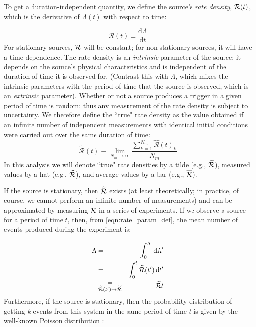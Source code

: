 To get a duration-independent quantity, we define the source's \emph{rate density}, $\mathcal{R}(t)$, which is the derivative of $\Lambda(t)$ with respect to time:

\begin{equation}
\label{eqn:rate_param_def}
\mathcal{R}(t) \equiv \frac{\mathrm{d}\Lambda}{\mathrm{d}t}
\end{equation}
For stationary sources, $\mathcal{R}$ will be constant; for non-stationary sources, it will have a time dependence. The rate density is an \emph{intrinsic} parameter of the source: it depends on the source's physical characteristics and is independent of the duration of time it is observed for. (Contrast this with $\Lambda$, which mixes the intrinsic parameters with the period of time that the source is observed, which is an \emph{extrinsic} parameter). Whether or not a source produces a trigger in a given period of time is random; thus any measurement of the rate density is subject to uncertainty. We therefore define the ``true" rate density as the value obtained if an infinite number of independent measurements with identical initial conditions were carried out over the same duration of time:
\begin{equation}
\label{eqn:true_rate_param_def}
\widetilde{\mathcal{R}}(t) \equiv \lim_{N_m \to \infty} \frac{\sum_{k=1}^{N_m} \widehat{\mathcal{R}}(t)_{k}}{N_m}
\end{equation}
In this analysis we will denote ``true" rate densities by a tilde (e.g., $\widetilde{\mathcal{R}}$), measured values by a hat (e.g., $\widehat{\mathcal{R}}$), and average values by a bar (e.g., $\overline{\mathcal{R}}$).

If the source is stationary, then $\widetilde{\mathcal{R}}$ exists (at least theoretically; in practice, of course, we cannot perform an infinite number of measurements) and can be approximated by measuring $\mathcal{R}$ in a series of experiments. If we observe a source for a period of time $t$, then, from \ref{eqn:rate_param_def}, the mean number of events produced during the experiment is:

\begin{eqnarray}
\Lambda & = & \int_{0}^{\Lambda}\, \mathrm{d}\Lambda' \nonumber \\
    & = & \int_{0}^{t} \widetilde{\mathcal{R}}(t')\, \mathrm{d}t' \\
    & \stackrel{=}{_{\widetilde{\mathcal{R}}(t') \rightarrow \widetilde{\mathcal{R}}}} & \widetilde{\mathcal{R}} t
\end{eqnarray}
Furthermore, if the source is stationary, then the probability distribution of getting $k$ events from this system in the same period of time $t$ is given by the well-known Poisson distribution \cite{Taylor:ErrorAnalysis:2E}:

